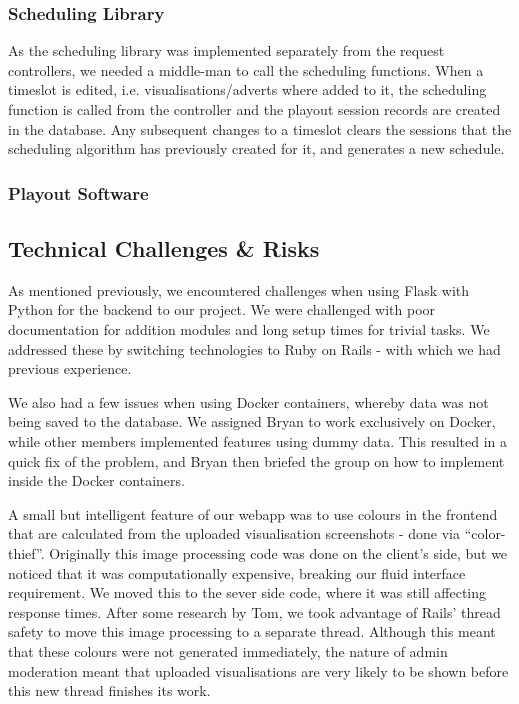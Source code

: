 \documentclass[a4paper, titlepage]{article}
\begin{document}
\subsubsection{Scheduling Library}


As the scheduling library was implemented separately from the request controllers,
we needed a middle-man to call the scheduling functions. When a timeslot is edited, i.e. 
visualisations/adverts where added to it, the scheduling function is called from
the controller and the playout session records are created in the database. Any 
subsequent changes to a timeslot clears the sessions that the scheduling algorithm 
has previously created for it, and generates a new schedule. 

\subsubsection{Playout Software}




\subsection{Technical Challenges \& Risks}

As mentioned previously, we encountered challenges when using Flask with Python for the backend to our 
project. We were challenged with poor documentation for addition modules and long setup times for 
trivial tasks. We addressed these by switching technologies to Ruby on Rails - with which we had 
previous experience. 

We also had a few issues when using Docker containers, whereby data was not being saved to the database.
We assigned Bryan to work exclusively on Docker, while other members implemented features using dummy 
data. This resulted in a quick fix of the problem, and Bryan then briefed the group on how to implement
inside the Docker containers. 

A small but intelligent feature of our webapp was to use colours in the frontend that are calculated 
from the uploaded visualisation screenshots - done via ``color-thief''. Originally this image
processing code was done on the client's side, but we noticed that it was computationally expensive,
breaking our fluid interface requirement. We moved this to the sever side code, where it was still 
affecting response times. After some research by Tom, we took advantage of Rails' thread safety to move
this image processing to a separate thread. Although this meant that these colours were not generated 
immediately, the nature of admin moderation meant that uploaded visualisations are very likely to be 
shown before this new thread finishes its work.
\end{document}
